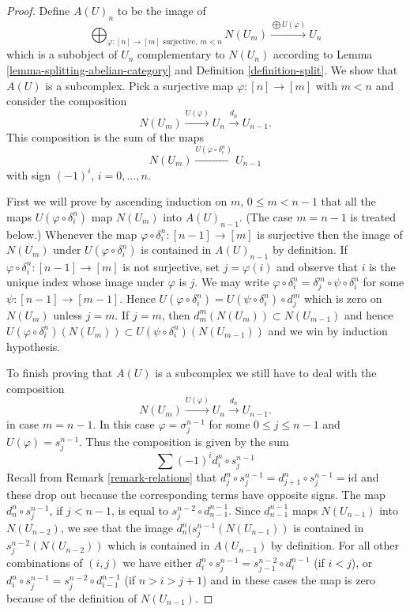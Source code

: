 \begin{proof}
Define $A(U)_n$ to be the image of
$$
\bigoplus\nolimits_{\varphi : [n] \to [m]\text{ surjective},\ m < n} N(U_m)
\xrightarrow{\bigoplus U(\varphi)}
U_n
$$
which is a subobject of $U_n$ complementary to
$N(U_n)$ according to Lemma \ref{lemma-splitting-abelian-category} and
Definition \ref{definition-split}. We show that
$A(U)$ is a subcomplex. Pick a surjective
map $\varphi : [n] \to [m]$ with $m < n$ and consider
the composition
$$
N(U_m) \xrightarrow{U(\varphi)} U_n \xrightarrow{d_n} U_{n - 1}.
$$
This composition is the sum of the maps
$$
N(U_m) \xrightarrow{U(\varphi \circ \delta^n_i)} U_{n - 1}
$$
with sign $(-1)^i$, $i = 0, \ldots, n$.

\medskip\noindent
First we will prove by ascending induction on $m$,
$0 \leq m < n - 1$ that all the maps $U(\varphi \circ \delta^n_i)$
map $N(U_m)$ into $A(U)_{n - 1}$. (The case $m = n - 1$ is treated below.)
Whenever the map $\varphi \circ \delta^n_i : [n - 1] \to [m]$
is surjective then the image of $N(U_m)$ under $U(\varphi \circ \delta^n_i)$
is contained in $A(U)_{n - 1}$ by definition.
If $\varphi \circ \delta^n_i : [n - 1] \to [m]$ is not surjective,
set $j = \varphi(i)$ and observe that $i$ is the unique
index whose image under $\varphi$ is $j$. We may write
$\varphi \circ \delta^n_i = \delta^m_j \circ \psi \circ \delta^n_i$
for some $\psi : [n - 1] \to [m - 1]$. Hence
$U(\varphi \circ \delta^n_i) = U(\psi \circ \delta^n_i) \circ d^m_j$ which
is zero on $N(U_m)$ unless $j = m$. If $j = m$, then
$d^m_m(N(U_m)) \subset N(U_{m - 1})$ and hence
$U(\varphi \circ \delta^n_i)(N(U_m)) \subset
U(\psi \circ \delta^n_i)(N(U_{m - 1}))$ and we win
by induction hypothesis.

\medskip\noindent
To finish proving that $A(U)$ is a subcomplex
we still have to deal with the composition
$$
N(U_m) \xrightarrow{U(\varphi)} U_n \xrightarrow{d_n} U_{n - 1}.
$$
in case $m =  n - 1$. In this case $\varphi = \sigma^{n - 1}_j$
for some $0 \leq j \leq n - 1$ and $U(\varphi) = s^{n - 1}_j$.
Thus the composition is given by the sum
$$
\sum (-1)^i d^n_i \circ s^{n - 1}_j
$$
Recall from Remark \ref{remark-relations} that
$d^n_j \circ s^{n - 1}_j = d^n_{j + 1} \circ s^{n - 1}_j = \text{id}$
and these drop out because the corresponding terms have opposite signs.
The map $d^n_n \circ s^{n - 1}_j$, if $j < n - 1$, is equal to
$s^{n - 2}_j \circ d^{n - 1}_{n - 1}$. Since 
$d^{n - 1}_{n - 1}$ maps $N(U_{n - 1})$ into $N(U_{n - 2})$,
we see that the image $d^n_n ( s^{n - 1}_j (N(U_{n - 1}))$
is contained in $s^{n - 2}_j(N(U_{n - 2}))$ which
is contained in $A(U_{n - 1})$ by definition. For all
other combinations of $(i, j)$ we have
either $d^n_i \circ s^{n - 1}_j = s^{n - 2}_{j - 1} \circ d^{n - 1}_i$
(if $i < j$), or
$d^n_i \circ s^{n - 1}_j = s^{n - 2}_j \circ d^{n - 1}_{i - 1}$
(if $n > i > j + 1$) and in these cases the map is zero because
of the definition of $N(U_{n - 1})$.
\end{proof}

